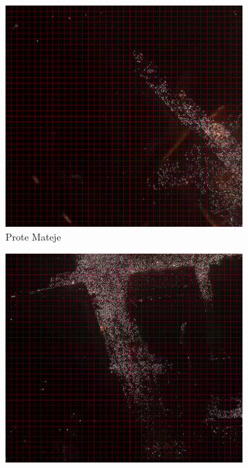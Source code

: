 \documentclass[a4paper,12pt]{article}
\begin{document}
\begin{figure}[H]
	\centering
  
	\begin{subfigure}[b]{0.3\textwidth}
	  \centering
	  \includegraphics[width=\textwidth]{../grid_output/prote-mateje_grid.png}
	  \caption{Prote Mateje}
	  \label{fig:prote-mateje}
	\end{subfigure}
	\hfill
	\begin{subfigure}[b]{0.3\textwidth}
	  \centering
	  \includegraphics[width=\textwidth]{../grid_output/nemanjina_grid.png}

\end{subfigure}
\end{figure}
\end{document}
